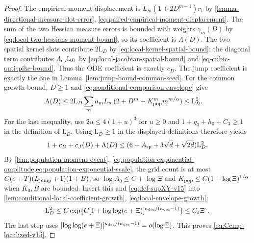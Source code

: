 \begin{proof}
The empirical moment displacement is
$L_m(1+2D^{m-1})r_t$ by \cref{lemma-directional-measure-slot-error},
\eqref{eq:paired-empirical-moment-displacement}. The sum of the two Hessian measure errors is bounded
with weights $\gamma_m(D)$ by \cref{eq:local-two-hessians-moment-bound},
so its coefficient is $\Lambda(D)$.
The two spatial kernel slots contribute $2\mathrm L_D$ by
\cref{eq:local-kernel-spatial-bound}; the diagonal term contributes
$A_{\rm sp}\mathrm L_D$ by \cref{eq:local-jacobian-spatial-bound} and
\cref{eq-cubic-antispike-bound}. Thus
the ODE coefficient is exactly $c_D$. The jump
coefficient is exactly the one in Lemma~\ref{lem:jump-bound-common-seed}.
For the common growth bound, $D\ge1$ and
\eqref{eq:conditional-comparison-envelope} give
\[
\begin{aligned}
 \Lambda(D)
 &\le2\mathrm L_D\sum_m a_mL_m
       (2+D^m+K_{\rm pop}^m m^{m/\alpha})
 \le\mathrm L_D^2.
\end{aligned}
\]
For the last inequality, use $2u\le4(1+u)^3$ for $u\ge0$ and
$1+g_0+h_0+C_3\ge1$ in the definition of $\mathrm L_D$.
Using $\mathrm L_D\ge1$ in the displayed definitions therefore yields
\begin{equation}
\label{eq:comparison-coefficients-common-envelope}
 1+c_D+c_J(D)+\Lambda(D)
 \le(6+A_{\rm sp}+3\sqrt d+\sqrt{2d})\mathrm L_D^2.
\end{equation}
By \cref{lem:population-moment-event},
\cref{eq:population-exponential-amplitude,eq:population-exponential-scale},
the grid count is at most $C(e+T)(L_{\mathrm{jump}}+1)(1+B)$, so
$\log A_0\le C+\log\Xi$ and
$K_{\rm pop}\le C(1+\log\Xi)^{1/\alpha}$ when $K_0,B$ are bounded.
Insert this and \eqref{eq:def-supXY-v15} into
\cref{lem:conditional-local-coefficient-growth}, \eqref{eq:local-envelope-growth}:
\[
 \mathrm L_D^2\le C\exp\{C[1+\log\log(e+\Xi)]^{\kappa_{\rm dec}/(\kappa_{\rm dec}-1)}\}
 \le C_\varepsilon\Xi^\varepsilon.
\]
The last step uses $[\log\log(e+\Xi)]^{\kappa_{\rm dec}/(\kappa_{\rm dec}-1)}
=o(\log\Xi)$. This proves \eqref{eq:Ccmp-localized-v15}.
\end{proof}

